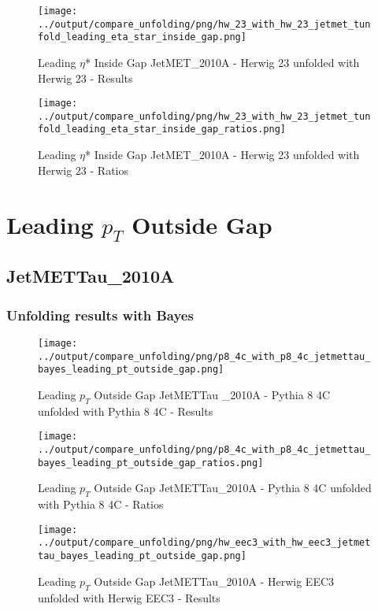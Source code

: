 \documentclass[11pt]{book}
\begin{document}
\begin{figure}[ht]
\centering
\texttt{[image: ../output/compare\_unfolding/png/hw\_23\_with\_hw\_23\_jetmet\_tunfold\_leading\_eta\_star\_inside\_gap.png]}
\caption{Leading $\eta$* Inside Gap JetMET\_2010A - Herwig 23 unfolded with Herwig 23 - Results}
\label{hw_23_hw_23_jetmet_tunfold_leading_eta_star_inside_gap_a}
\end{figure}

\begin{figure}[ht]
\centering
\texttt{[image: ../output/compare\_unfolding/png/hw\_23\_with\_hw\_23\_jetmet\_tunfold\_leading\_eta\_star\_inside\_gap\_ratios.png]}
\caption{Leading $\eta$* Inside Gap JetMET\_2010A - Herwig 23 unfolded with Herwig 23 - Ratios}
\label{hw_23_hw_23_jetmet_tunfold_leading_eta_star_inside_gap_b}
\end{figure}


\cleardoublepage

\chapter{Leading $p_{T}$ Outside Gap}
\section{JetMETTau\_2010A}
\subsection{Unfolding results with Bayes}


\begin{figure}[ht]
\centering
\texttt{[image: ../output/compare\_unfolding/png/p8\_4c\_with\_p8\_4c\_jetmettau\_bayes\_leading\_pt\_outside\_gap.png]}
\caption{Leading $p_{T}$ Outside Gap JetMETTau \_2010A - Pythia 8 4C unfolded with Pythia 8 4C - Results}
\label{p8_p8_jetmettau_bayes_leading_pt_outside_gap_a}
\end{figure}

\begin{figure}[ht]
\centering
\texttt{[image: ../output/compare\_unfolding/png/p8\_4c\_with\_p8\_4c\_jetmettau\_bayes\_leading\_pt\_outside\_gap\_ratios.png]}
\caption{Leading $p_{T}$ Outside Gap JetMETTau\_2010A - Pythia 8 4C unfolded with Pythia 8 4C - Ratios}
\label{p8_p8_jetmettau_bayes_leading_pt_outside_gap_b}
\end{figure}

\begin{figure}[ht]
\centering
\texttt{[image: ../output/compare\_unfolding/png/hw\_eec3\_with\_hw\_eec3\_jetmettau\_bayes\_leading\_pt\_outside\_gap.png]}
\caption{Leading $p_{T}$ Outside Gap JetMETTau\_2010A - Herwig EEC3 unfolded with Herwig EEC3 - Results}
\label{hw_eec3_hw_eec3_jetmettau_bayes_leading_pt_outside_gap_a}
\end{figure}
\end{document}

